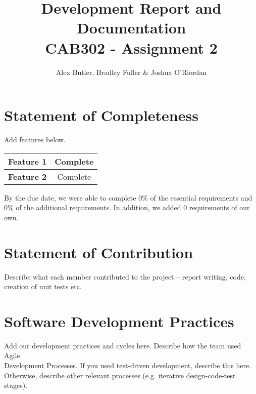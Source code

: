 \documentclass[12pt]{article} %
\begin{document}

\title{Development Report and Documentation
		 \\ \large CAB302 - Assignment 2}

\author {Alex Butler,  Bradley Fuller \& Joshua O'Riordan}
\maketitle

\tableofcontents

\newpage

\section{Statement of Completeness}

Add features below. 
\begin{center}
	\begin{tabular}{|c|c|}
		\hline  \textbf{Feature 1} & Complete \\
		\hline  \textbf{Feature 2} & Complete  \\
		\hline
	\end{tabular}
\end{center}
By the due date, we were able to complete 0\% of the essential requirements and 0\% of the additional requirements. In addition, we added 0 requirements of our own.

\newpage

\section{Statement of Contribution}

Describe what each member contributed to the project – report writing, code, creation of unit tests etc.

\newpage

\section{Software Development Practices}

Add our development practices and cycles here. Describe how the team used Agile \\
Development Processes. If you used test-driven development, describe this here.\\
Otherwise, describe other relevant processes (e.g. iterative design-code-test stages).

\newpage
\end{document}

